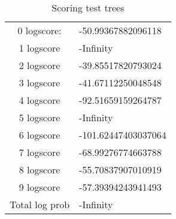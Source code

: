 \documentclass{article}
\begin{document}
\vspace{1cm}
\begin {table}[h]
\centering
\begin{tabular}{c l}
0 logscore: & -50.99367882096118 \\
1 logscore &  -Infinity  \\
2 logscore &  -39.85517820793024  \\
3 logscore &  -41.67112250048548  \\
4 logscore &  -92.51659159264787  \\
5 logscore &  -Infinity  \\
6 logscore &  -101.62447403037064  \\
7 logscore &  -68.99276774663788  \\
8 logscore &  -55.70837907010919  \\
9 logscore &  -57.39394243941493  \\
Total log prob & -Infinity \\
\end{tabular}
\caption{Scoring test trees}
\label{tab:scores}
\end {table}
\end{document}
